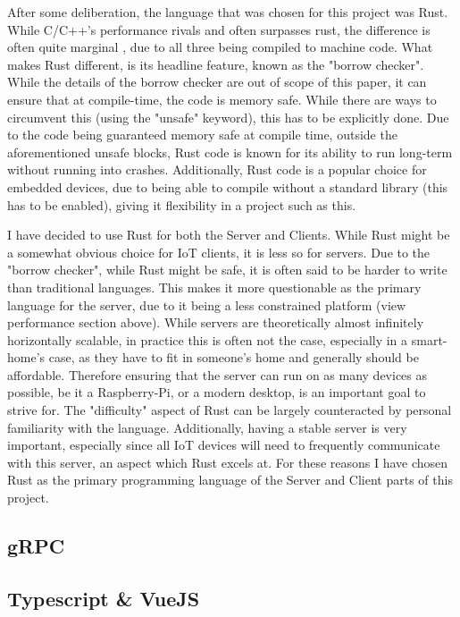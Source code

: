 After some deliberation, the language that was chosen for this project was Rust. While C/C++'s performance rivals and often surpasses rust, the difference is often quite marginal \cite{PerformanceEvalOnMicrocontroller}, due to all three being compiled to machine code. What makes Rust different, is its headline feature, known as the "borrow checker". While the details of the borrow checker are out of scope of this paper, it can ensure that at compile-time, the code is memory safe. While there are ways to circumvent this (using the "unsafe" keyword), this has to be explicitly done. Due to the code being guaranteed memory safe at compile time, outside the aforementioned unsafe blocks, Rust code is known for its ability to run long-term without running into crashes. Additionally, Rust code is a popular choice for embedded devices, due to being able to compile without a standard library (this has to be enabled), giving it flexibility in a project such as this.

I have decided to use Rust for both the Server and Clients. While Rust might be a somewhat obvious choice for IoT clients, it is less so for servers. Due to the "borrow checker", while Rust might be safe, it is often said to be harder to write than traditional languages. This makes it more questionable as the primary language for the server, due to it being a less constrained platform (view performance section above). While servers are theoretically almost infinitely horizontally scalable, in practice this is often not the case, especially in a smart-home's case, as they have to fit in someone's home and generally should be affordable. Therefore ensuring that the server can run on as many devices as possible, be it a Raspberry-Pi, or a modern desktop, is an important goal to strive for. The "difficulty" aspect of Rust can be largely counteracted by personal familiarity with the language. Additionally, having a stable server is very important, especially since all IoT devices will need to frequently communicate with this server, an aspect which Rust excels at. For these reasons I have chosen Rust as the primary programming language of the Server and Client parts of this project.

\subsection{gRPC} \label{sec:chap3:technology:grpc}
\subsection{Typescript \& VueJS} \label{sec:chap3:technology:ts}
